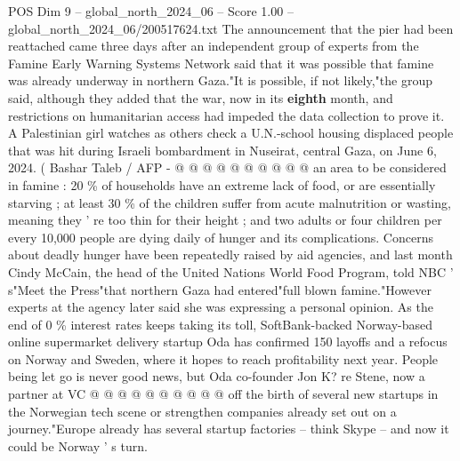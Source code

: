 \begin{textsample}{POS Dim 9 – global\_north\_2024\_06 – Score 1.00 – global\_north\_2024\_06/200517624.txt}
The announcement that the pier had been reattached came three days after an independent group of experts from the Famine Early Warning Systems Network said that it was possible that famine was already underway in northern Gaza."It is possible, if not likely,"the group said, although they added that the war, now in its \textbf{eighth} month, and restrictions on humanitarian access had impeded the data collection to prove it.
A Palestinian girl watches as others check a U.N.-school housing displaced people that was hit during Israeli bombardment in Nuseirat, central Gaza, on June 6, 2024. ( Bashar Taleb / AFP - @ @ @ @ @ @ @ @ @ @ an area to be considered in famine : 20 \% of households have an extreme lack of food, or are essentially starving ; at least 30 \% of the children suffer from acute malnutrition or wasting, meaning they ' re too thin for their height ; and two adults or four children per every 10,000 people are dying daily of hunger and its complications.
Concerns about deadly hunger have been repeatedly raised by aid agencies, and last month Cindy McCain, the head of the United Nations World Food Program, told NBC ' s"Meet the Press"that northern Gaza had entered"full blown famine."However experts at the agency later said she was expressing a personal opinion.
As the end of 0 \% interest rates keeps taking its toll, SoftBank-backed Norway-based online supermarket delivery startup Oda has confirmed 150 layoffs and a refocus on Norway and Sweden, where it hopes to reach profitability next year.
People being let go is never good news, but Oda co-founder Jon K? re Stene, now a partner at VC @ @ @ @ @ @ @ @ @ @ off the birth of several new startups in the Norwegian tech scene or strengthen companies already set out on a journey."Europe already has several startup factories -- think Skype -- and now it could be Norway ' s turn.

\end{textsample}
